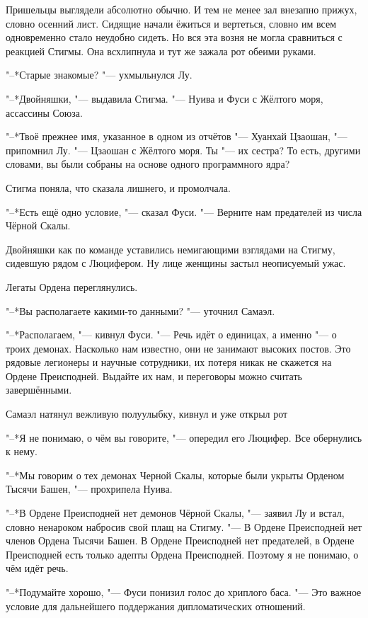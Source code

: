 Пришельцы выглядели абсолютно обычно.
И тем не менее зал внезапно прижух, словно осенний лист.
Сидящие начали ёжиться и вертеться, словно им всем одновременно стало неудобно сидеть.
Но вся эта возня не могла сравниться с реакцией Стигмы.
Она всхлипнула и тут же зажала рот обеими руками.

"--*Старые знакомые? "--- ухмыльнулся Лу.

"--*Двойняшки, "--- выдавила Стигма.
"--- Нуива и Фуси с Жёлтого моря, ассассины Союза.

"--*Твоё прежнее имя, указанное в одном из отчётов "--- Хуанхай Цзаошан, "--- припомнил Лу.
"--- Цзаошан с Жёлтого моря.
Ты "--- их сестра?
То есть, другими словами, вы были собраны на основе одного программного ядра?

Стигма поняла, что сказала лишнего, и промолчала.

\spacing

"--*Есть ещё одно условие, "--- сказал Фуси.
"--- Верните нам предателей из числа Чёрной Скалы.

Двойняшки как по команде уставились немигающими взглядами на Стигму, сидевшую рядом с Люцифером.
Ну лице женщины застыл неописуемый ужас.

Легаты Ордена переглянулись.

"--*Вы располагаете какими-то данными? "--- уточнил Самаэл.

"--*Располагаем, "--- кивнул Фуси.
"--- Речь идёт о единицах, а именно "--- о троих демонах.
Насколько нам известно, они не занимают высоких постов.
Это рядовые легионеры и научные сотрудники, их потеря никак не скажется на Ордене Преисподней.
Выдайте их нам, и переговоры можно считать завершёнными.

Самаэл натянул вежливую полуулыбку, кивнул и уже открыл рот\ldotst

"--*Я не понимаю, о чём вы говорите, "--- опередил его Люцифер.
Все обернулись к нему.

"--*Мы говорим о тех демонах Черной Скалы, которые были укрыты Орденом Тысячи Башен, "--- прохрипела Нуива.

"--*В Ордене Преисподней нет демонов Чёрной Скалы, "--- заявил Лу и встал, словно ненароком набросив свой плащ на Стигму.
"--- В Ордене Преисподней нет членов Ордена Тысячи Башен.
В Ордене Преисподней нет предателей, в Ордене Преисподней есть только адепты Ордена Преисподней.
Поэтому я не понимаю, о чём идёт речь.

"--*Подумайте хорошо, "--- Фуси понизил голос до хриплого баса.
"--- Это важное условие для дальнейшего поддержания дипломатических отношений.

